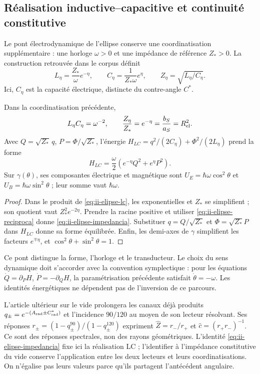 \subsection{Réalisation inductive--capacitive et continuité constitutive}
\label{sec:ii-elipse-lc}

Le pont électrodynamique de l’ellipse conserve une coordinatisation supplémentaire :
une horloge \(\omega>0\) et une impédance de référence \(Z_*>0\).
La construction retrouvée dans le corpus définit
\begin{equation}
 L_\eta=\frac{Z_*}{\omega}e^{-\eta},\qquad
 C_\eta=\frac{1}{Z_*\omega}e^\eta,
 \qquad Z_\eta=\sqrt{L_\eta/C_\eta}.
 \label{eq:ii-elipse-lc}
\end{equation}
Ici, \(C_\eta\) est la capacité électrique, distincte du contre-angle \(C^*\).
\begin{proposition}
\label{prop:ii-elipse-lc}
Dans la coordinatisation précédente,
\begin{equation}
 L_\eta C_\eta=\omega^{-2},\qquad
 \frac{Z_\eta}{Z_*}=e^{-\eta}
 =\frac{b_S}{a_S}=R_{\rm el}^{2}.
 \label{eq:ii-elipse-impedancia}
\end{equation}
Avec \(Q=\sqrt{Z_*}\,q\), \(P=\Phi/\sqrt{Z_*}\), l'énergie
\(H_{LC}=q^2/(2C_\eta)+\Phi^2/(2L_\eta)\) prend la forme
\[
 H_{LC}=\frac\omega2(e^{-\eta}Q^2+e^\eta P^2).
\]
Sur \(\gamma(\theta)\), ses composantes électrique et magnétique sont
\(U_E=\hbar\omega\cos^2\theta\) et
\(U_B=\hbar\omega\sin^2\theta\) ; leur somme vaut \(\hbar\omega\).
\end{proposition}
\begin{proof}
Dans le produit de \eqref{eq:ii-elipse-lc}, les exponentielles et
\(Z_*\) se simplifient ; son quotient vaut \(Z_*^2e^{-2\eta}\). Prendre la racine
positive et utiliser \eqref{eq:ii-elipse-reciproca} donne
\eqref{eq:ii-elipse-impedancia}. Substituer \(q=Q/\sqrt{Z_*}\)
et \(\Phi=\sqrt{Z_*}P\) dans \(H_{LC}\) donne sa forme équilibrée.
Enfin, les demi-axes de \(\gamma\) simplifient les facteurs
\(e^{\mp\eta}\), et \(\cos^2\theta+\sin^2\theta=1\).
\end{proof}

Ce pont distingue la forme, l'horloge et le transducteur. Le choix
du sens dynamique doit s'accorder avec la convention symplectique : pour
les équations \(\dot Q=\partial_PH\),
\(\dot P=-\partial_QH\), la paramétrisation précédente satisfait
\(\dot\theta=-\omega\). Les identités énergétiques ne dépendent pas
de l'inversion de ce parcours.

L’article ultérieur sur le vide prolongera les canaux déjà produits
\(q_\pm=e^{-(A_{\rm rad}\pm C^*_{\rm rad})}\) et l’incidence
\(90/120\) au moyen de son lecteur résolvant. Ses réponses
\(r_\pm=(1-q_\pm^{90})/(1-q_\pm^{120})\) expriment
\(\widehat Z=r_-/r_+\) et \(\widehat c=(r_+r_-)^{-1}\).
Ce sont des réponses spectrales, non des rayons géométriques. L’identité
\eqref{eq:ii-elipse-impedancia} fixe ici la réalisation LC ;
l’identifier à l’impédance constitutive du vide conserve l’application
entre les deux lecteurs et leurs coordinatisations. On n’égalise pas leurs valeurs parce qu’ils partagent
l’antécédent angulaire.
